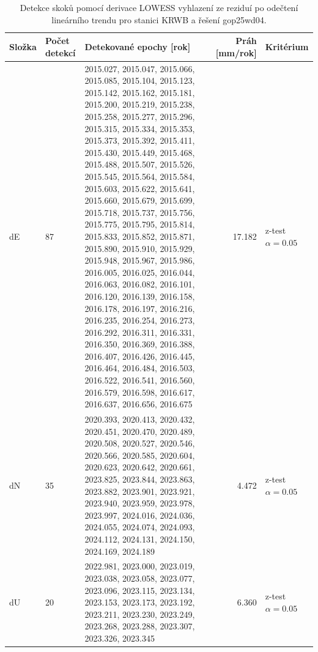 \begin{table}[htbp]
\caption{Detekce skoků pomocí derivace LOWESS vyhlazení ze reziduí po odečtení lineárního trendu pro stanici KRWB a řešení gop25wd04.}
\label{tab:gop25wd04_stcd_krwb_detr_weighted_1seg_jumps_lowess_derivative}
\begin{tabular}{lllrl}
\toprule
Složka & Počet detekcí & Detekované epochy [rok] & Práh [mm/rok] & Kritérium \\
\midrule
dE & 87 & 2015.027, 2015.047, 2015.066, 2015.085, 2015.104, 2015.123, 2015.142, 2015.162, 2015.181, 2015.200, 2015.219, 2015.238, 2015.258, 2015.277, 2015.296, 2015.315, 2015.334, 2015.353, 2015.373, 2015.392, 2015.411, 2015.430, 2015.449, 2015.468, 2015.488, 2015.507, 2015.526, 2015.545, 2015.564, 2015.584, 2015.603, 2015.622, 2015.641, 2015.660, 2015.679, 2015.699, 2015.718, 2015.737, 2015.756, 2015.775, 2015.795, 2015.814, 2015.833, 2015.852, 2015.871, 2015.890, 2015.910, 2015.929, 2015.948, 2015.967, 2015.986, 2016.005, 2016.025, 2016.044, 2016.063, 2016.082, 2016.101, 2016.120, 2016.139, 2016.158, 2016.178, 2016.197, 2016.216, 2016.235, 2016.254, 2016.273, 2016.292, 2016.311, 2016.331, 2016.350, 2016.369, 2016.388, 2016.407, 2016.426, 2016.445, 2016.464, 2016.484, 2016.503, 2016.522, 2016.541, 2016.560, 2016.579, 2016.598, 2016.617, 2016.637, 2016.656, 2016.675 & 17.182 & z-test $\alpha=0.05$ \\
dN & 35 & 2020.393, 2020.413, 2020.432, 2020.451, 2020.470, 2020.489, 2020.508, 2020.527, 2020.546, 2020.566, 2020.585, 2020.604, 2020.623, 2020.642, 2020.661, 2023.825, 2023.844, 2023.863, 2023.882, 2023.901, 2023.921, 2023.940, 2023.959, 2023.978, 2023.997, 2024.016, 2024.036, 2024.055, 2024.074, 2024.093, 2024.112, 2024.131, 2024.150, 2024.169, 2024.189 & 4.472 & z-test $\alpha=0.05$ \\
dU & 20 & 2022.981, 2023.000, 2023.019, 2023.038, 2023.058, 2023.077, 2023.096, 2023.115, 2023.134, 2023.153, 2023.173, 2023.192, 2023.211, 2023.230, 2023.249, 2023.268, 2023.288, 2023.307, 2023.326, 2023.345 & 6.360 & z-test $\alpha=0.05$ \\
\bottomrule
\end{tabular}
\end{table}
